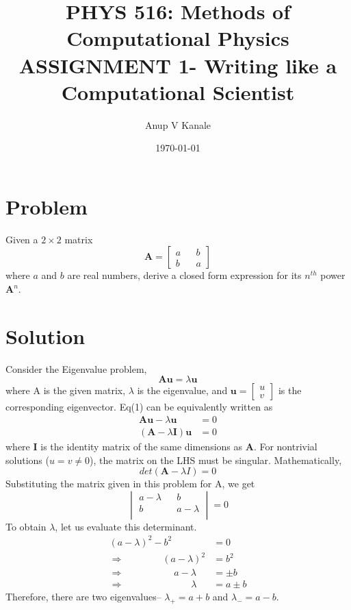 \documentclass[11pt, oneside]{article}   	%
\title{\large PHYS 516: Methods of Computational Physics \\
  \normalsize ASSIGNMENT 1- Writing like a Computational Scientist}
\author{Anup V Kanale}
\date{\today}							%
\begin{document}
\maketitle
\section{Problem}
Given a $2 \times 2$ matrix
\begin{equation}
\boldsymbol{A} = 
\begin{bmatrix}
a && b \\
b && a
\end{bmatrix}
\end{equation}
where $a$ and $b$ are real numbers, derive a closed form expression for its $n^{th}$ power $\boldsymbol{A}^n$.
\section{Solution}
Consider the Eigenvalue problem,
\begin{equation}
\boldsymbol{A} \boldsymbol{u} = \lambda \boldsymbol{u}
\end{equation}
where A is the given matrix, $\lambda$ is the eigenvalue, and $\boldsymbol{u}= \begin{bmatrix}
u \\ v
\end{bmatrix}$ is the corresponding eigenvector.
Eq(1) can be equivalently written as
\begin{align}
\boldsymbol{A} \boldsymbol{u} - \lambda \boldsymbol{u} &= 0 \\
(\boldsymbol{A}-\lambda \boldsymbol{I})\boldsymbol{u} &= 0
\end{align}
where $\boldsymbol{I}$ is the identity matrix of the same dimensions as $\boldsymbol{A}$. For nontrivial solutions ($u=v \neq 0$), the matrix on the LHS must be singular. Mathematically,
\begin{equation}
det(\boldsymbol{A}-\lambda I) = 0
\end{equation}
Substituting the matrix given in this problem for A, we get
\begin{equation}
\begin{vmatrix}
a-\lambda && b \\
b && a-\lambda \\
\end{vmatrix} = 0
\end{equation}
To obtain $\lambda$, let us evaluate this determinant.
\begin{align}
(a-\lambda)^2 - b^2 &= 0 \\
\Rightarrow \qquad \qquad (a-\lambda)^2 &= b^2 \\
\Rightarrow \quad \qquad \qquad \ a-\lambda &= \pm b \\
\Rightarrow \qquad \qquad \qquad \quad \lambda &= a \pm b
\end{align}
Therefore, there are two eigenvalues-- $\lambda_+ = a + b$ and $\lambda_- = a - b$.
\end{document}
